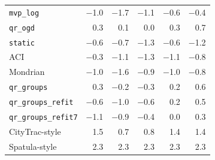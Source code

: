 \begin{tabular}{@{}lrrrrr@{}}
\texttt{mvp\_log} & $-$1.0 & $-$1.7 & $-$1.1 & $-$0.6 & $-$0.4 \\
\texttt{qr\_ogd} & 0.3 & 0.1 & 0.0 & 0.3 & 0.7 \\
\texttt{static} & $-$0.6 & $-$0.7 & $-$1.3 & $-$0.6 & $-$1.2 \\
ACI & $-$0.3 & $-$1.1 & $-$1.3 & $-$1.1 & $-$0.8 \\
Mondrian & $-$1.0 & $-$1.6 & $-$0.9 & $-$1.0 & $-$0.8 \\
\texttt{qr\_groups} & 0.3 & $-$0.2 & $-$0.3 & 0.2 & 0.6 \\
\texttt{qr\_groups\_refit} & $-$0.6 & $-$1.0 & $-$0.6 & 0.2 & 0.5 \\
\texttt{qr\_groups\_refit7} & $-$1.1 & $-$0.9 & $-$0.4 & 0.0 & 0.3 \\
CityTrac-style & 1.5 & 0.7 & 0.8 & 1.4 & 1.4 \\
Spatula-style & 2.3 & 2.3 & 2.3 & 2.3 & 2.3 \\
\bottomrule
\end{tabular}
